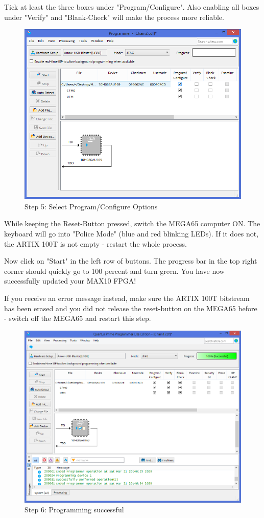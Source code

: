 Tick at least the three boxes under "Program/Configure". Also enabling all boxes under "Verify" and "Blank-Check"
will make the process more reliable.

\begin{figure}
  \includegraphics[width=\linewidth]{images/max10_05.png}
  \caption{Step 5: Select Program/Configure Options}
  \label{fig:max10_05}
\end{figure}

While keeping the Reset-Button pressed, switch the MEGA65 computer ON. The keyboard will go into "Police Mode" 
(blue and red blinking LEDs). If it does not, the ARTIX 100T is not empty - restart the whole process.

Now click on "Start" in the left row of buttons. The progress bar in the top right corner should quickly go to
100 percent and turn green. You have now successfully updated your MAX10 FPGA!

If you receive an error message instead, make sure the ARTIX 100T bitstream has been erased and you did not
release the reset-button on the MEGA65 before - switch off the MEGA65 and restart this step.

\begin{figure}
  \includegraphics[width=\linewidth]{images/max10_06.png}
  \caption{Step 6: Programming successful}
  \label{fig:max10_06}
\end{figure}
